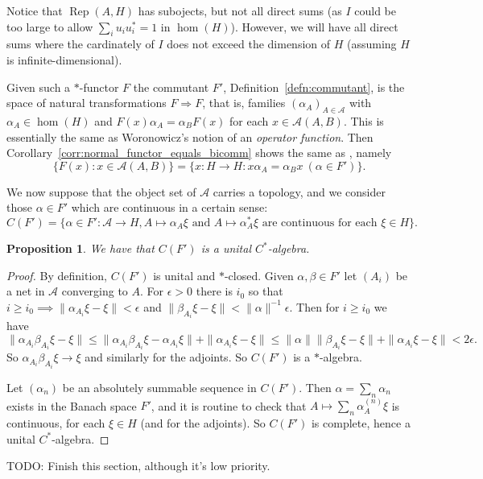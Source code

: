 \documentclass[a4paper,11pt]{article}
\theoremstyle{plain}
\newtheorem{proposition}{Proposition}[section]
\theoremstyle{remark}
\newcommand{\mc}[1]{\mathcal{#1}}
\newcommand{\Rep}{\operatorname{Rep}}
\begin{document}
Notice that $\Rep(A,H)$ has subojects, but not all direct sums (as $I$ could be too large to allow $\sum_i u_i u_i^*=1$ in $\hom(H)$).  However, we will have all direct sums where the cardinately of $I$ does not exceed the dimension of $H$ (assuming $H$ is infinite-dimensional).

Given such a $*$-functor $F$ the commutant $F'$, Definition~\ref{defn:commutant}, is the space of natural transformations $F \Rightarrow F$, that is, families $(\alpha_A)_{A\in\mc A}$ with $\alpha_A\in\hom(H)$ and $F(x) \alpha_A = \alpha_B F(x)$ for each $x\in\mc A(A,B)$.  This is essentially the same as Woronowicz's notion of an \emph{operator function}.  Then Corollary~\ref{corr:normal_functor_equals_bicomm} shows the same as \cite[Theorem~2]{Woronowicz_DualityCStar}, namely
\[ \{ F(x) : x\in\mc A(A,B) \} = \{ x\colon H\to H : x \alpha_A = \alpha_B x \ (\alpha\in F') \}. \]

We now suppose that the object set of $\mc A$ carries a topology, and we consider those $\alpha\in F'$ which are continuous in a certain sense:
\[ C(F') = \{ \alpha \in F' : \mc A \to H, A \mapsto \alpha_A\xi \text{ and } A \mapsto \alpha_A^*\xi \text{ are continuous for each } \xi\in H \}. \]

\begin{proposition}
We have that $C(F')$ is a unital $C^*$-algebra.
\end{proposition}
\begin{proof}
By definition, $C(F')$ is unital and $*$-closed.  Given $\alpha,\beta\in F'$ let $(A_i)$ be a net in $\mc A$ converging to $A$.  For $\epsilon>0$ there is $i_0$ so that $i\geq i_0 \implies \| \alpha_{A_i}\xi-\xi\|<\epsilon$ and $\|\beta_{A_i}\xi-\xi\| < \|\alpha\|^{-1}\epsilon$.  Then for $i\geq i_0$ we have
\[ \| \alpha_{A_i} \beta_{A_i} \xi - \xi \| \leq \|\alpha_{A_i}\beta_{A_i}\xi - \alpha_{A_i}\xi\| + \|\alpha_{A_i}\xi-\xi\|
\leq \|\alpha\| \|\beta_{A_i}\xi-\xi\| + \|\alpha_{A_i}\xi-\xi\| < 2\epsilon. \]
So $\alpha_{A_i} \beta_{A_i} \xi \to \xi$ and similarly for the adjoints.  So $C(F')$ is a $*$-algebra.

Let $(\alpha_n)$ be an absolutely summable sequence in $C(F')$.  Then $\alpha = \sum_n \alpha_n$ exists in the Banach space $F'$, and it is routine to check that $A \mapsto \sum_n \alpha^{(n)}_A\xi$ is continuous, for each $\xi\in H$ (and for the adjoints).  So $C(F')$ is complete, hence a unital $C^*$-algebra.
\end{proof}

TODO: Finish this section, although it's low priority.
\end{document}
